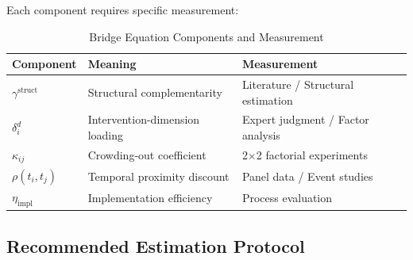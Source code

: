 Each component requires specific measurement:

\begin{table}[h]
\centering
\caption{Bridge Equation Components and Measurement}
\label{tab:bridge-measurement}
\begin{tabular}{lll}
\hline
\textbf{Component} & \textbf{Meaning} & \textbf{Measurement} \\
\hline
$\gamma^{\text{struct}}$ & Structural complementarity & Literature / Structural estimation \\
$\delta_i^d$ & Intervention-dimension loading & Expert judgment / Factor analysis \\
$\kappa_{ij}$ & Crowding-out coefficient & 2×2 factorial experiments \\
$\rho(t_i, t_j)$ & Temporal proximity discount & Panel data / Event studies \\
$\eta_{\text{impl}}$ & Implementation efficiency & Process evaluation \\
\hline
\end{tabular}
\end{table}

\subsection{Recommended Estimation Protocol}
\label{subsec:estimation-protocol}

